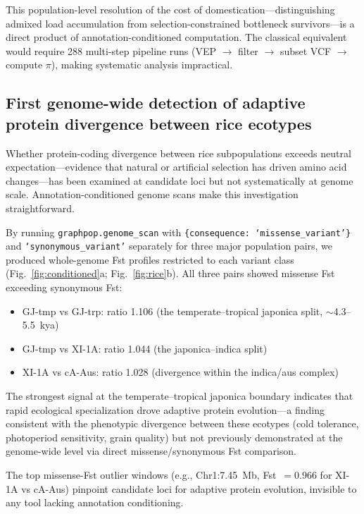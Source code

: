 This population-level resolution of the cost of domestication---distinguishing admixed load accumulation from selection-constrained bottleneck survivors---is a direct product of annotation-conditioned computation. The classical equivalent would require 288 multi-step pipeline runs (VEP $\to$ filter $\to$ subset VCF $\to$ compute $\pi$), making systematic analysis impractical.

\subsection*{First genome-wide detection of adaptive protein divergence between rice ecotypes}

Whether protein-coding divergence between rice subpopulations exceeds neutral expectation---evidence that natural or artificial selection has driven amino acid changes---has been examined at candidate loci but not systematically at genome scale. Annotation-conditioned genome scans make this investigation straightforward.

By running \texttt{graphpop.genome\_scan} with \texttt{\{consequence: `missense\_variant'\}} and \texttt{`synonymous\_variant'} separately for three major population pairs, we produced whole-genome Fst profiles restricted to each variant class (Fig.~\ref{fig:conditioned}a; Fig.~\ref{fig:rice}b). All three pairs showed missense Fst exceeding synonymous Fst:

\begin{itemize}
\item GJ-tmp vs GJ-trp: ratio 1.106 (the temperate--tropical japonica split, $\sim$4.3--5.5~kya\cite{alam2025genomics})
\item GJ-tmp vs XI-1A: ratio 1.044 (the japonica--indica split)
\item XI-1A vs cA-Aus: ratio 1.028 (divergence within the indica/aus complex)
\end{itemize}

The strongest signal at the temperate--tropical japonica boundary indicates that rapid ecological specialization drove adaptive protein evolution---a finding consistent with the phenotypic divergence between these ecotypes (cold tolerance, photoperiod sensitivity, grain quality) but not previously demonstrated at the genome-wide level via direct missense/synonymous Fst comparison.

The top missense-Fst outlier windows (e.g., Chr1:7.45~Mb, Fst~$= 0.966$ for XI-1A vs cA-Aus) pinpoint candidate loci for adaptive protein evolution, invisible to any tool lacking annotation conditioning.

